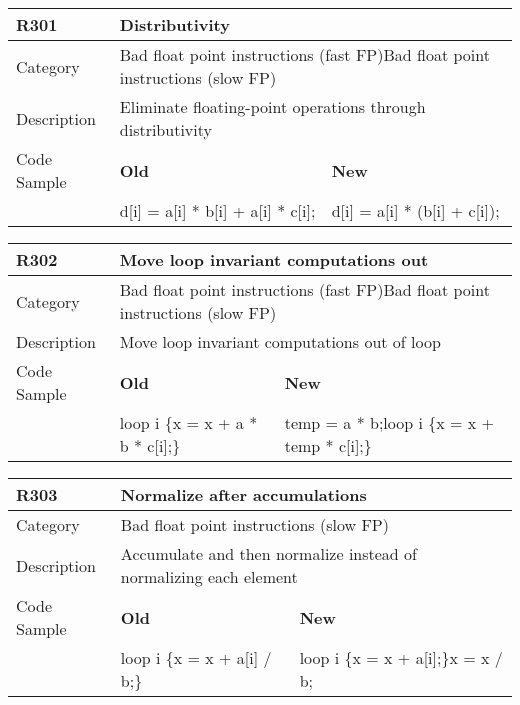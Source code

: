 \begin{tabular}{|p{0.9in}|p{2.0in}|p{2.0in}|} \hline
\textbf{R301}       & \multicolumn{2}{|p{4.0in}|}{\textbf{Distributivity}} \\ \hline
Category            & \multicolumn{2}{|p{4.0in}|}{Bad float point instructions (fast FP)\newline Bad float point instructions (slow FP)} \\ \hline
Description         & \multicolumn{2}{|p{4.0in}|}{Eliminate floating-point operations through distributivity} \\ \hline
Code Sample         & \textbf{Old} & \textbf{New} \\ \hline
                    & d[i] = a[i] * b[i] + a[i] * c[i];
                    & d[i] = a[i] * (b[i] + c[i]); \\ \hline
\end{tabular}

\begin{tabular}{|p{0.9in}|p{2.0in}|p{2.0in}|} \hline
\textbf{R302}       & \multicolumn{2}{|p{4.0in}|}{\textbf{Move loop invariant computations out}} \\ \hline
Category            & \multicolumn{2}{|p{4.0in}|}{Bad float point instructions (fast FP)\newline Bad float point instructions (slow FP)} \\ \hline
Description         & \multicolumn{2}{|p{4.0in}|}{Move loop invariant computations out of loop} \\ \hline
Code Sample         & \textbf{Old} & \textbf{New} \\ \hline
                    & loop i \{\newline   x = x + a * b * c[i];\newline \}
                    & temp = a * b;\newline loop i \{\newline   x = x + temp * c[i];\newline \} \\ \hline
\end{tabular}

\begin{tabular}{|p{0.9in}|p{2.0in}|p{2.0in}|} \hline
\textbf{R303}       & \multicolumn{2}{|p{4.0in}|}{\textbf{Normalize after accumulations}} \\ \hline
Category            & \multicolumn{2}{|p{4.0in}|}{Bad float point instructions (slow FP)} \\ \hline
Description         & \multicolumn{2}{|p{4.0in}|}{Accumulate and then normalize instead of normalizing each element} \\ \hline
Code Sample         & \textbf{Old} & \textbf{New} \\ \hline
                    & loop i \{\newline   x = x + a[i] / b;\newline \}
                    & loop i \{\newline   x = x + a[i];\newline \}\newline x = x / b; \\ \hline
\end{tabular}


